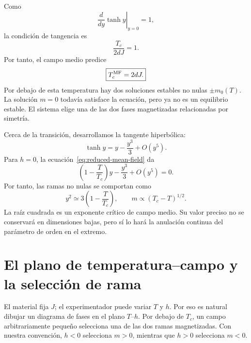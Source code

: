 Como
\begin{equation}
\left.\frac{d}{dy}\tanh y\right|_{y=0}=1,
\end{equation}
la condición de tangencia es
\begin{equation}
\frac{T_c}{2dJ}=1.
\end{equation}
Por tanto, el campo medio predice
\begin{equation}
\boxed{T_c^{\rm MF}=2dJ.}
\label{eq:sm10-mean-field-tc}
\end{equation}
Por debajo de esta temperatura hay dos soluciones estables no nulas \(\pm m_0(T)\). La solución \(m=0\) todavía satisface la ecuación, pero ya no es un equilibrio estable. El sistema elige una de las dos fases magnetizadas relacionadas por simetría.

\begin{classroomqa}
\end{classroomqa}

Cerca de la transición, desarrollamos la tangente hiperbólica:
\begin{equation}
\tanh y=y-\frac{y^3}{3}+O(y^5).
\end{equation}
Para \(h=0\), la ecuación~\eqref{eq:reduced-mean-field} da
\begin{equation}
\left(1-\frac{T}{T_c}\right)y-\frac{y^3}{3}+O(y^5)=0.
\end{equation}
Por tanto, las ramas no nulas se comportan como
\begin{equation}
y^2\simeq3\left(1-\frac{T}{T_c}\right),
\qquad
m\propto(T_c-T)^{1/2}.
\label{eq:mf-beta-exponent}
\end{equation}
La raíz cuadrada es un exponente crítico de campo medio. Su valor preciso no se conservará en dimensiones bajas, pero sí lo hará la anulación continua del parámetro de orden en el extremo.

\section{El plano de temperatura--campo y la selección de rama}

El material fija \(J\); el experimentador puede variar \(T\) y \(h\). Por eso es natural dibujar un diagrama de fases en el plano \(T\)--\(h\). Por debajo de \(T_c\), un campo arbitrariamente pequeño selecciona una de las dos ramas magnetizadas. Con nuestra convención, \(h<0\) selecciona \(m>0\), mientras que \(h>0\) selecciona \(m<0\).

